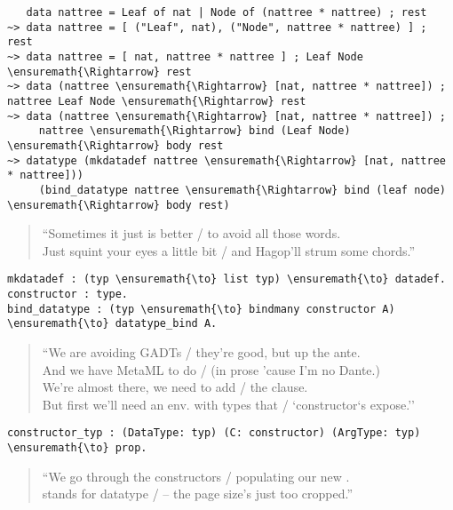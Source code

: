 \begin{verbatim}
   data nattree = Leaf of nat | Node of (nattree * nattree) ; rest
~> data nattree = [ ("Leaf", nat), ("Node", nattree * nattree) ] ; rest
~> data nattree = [ nat, nattree * nattree ] ; Leaf Node \ensuremath{\Rightarrow} rest
~> data (nattree \ensuremath{\Rightarrow} [nat, nattree * nattree]) ; nattree Leaf Node \ensuremath{\Rightarrow} rest
~> data (nattree \ensuremath{\Rightarrow} [nat, nattree * nattree]) ;
     nattree \ensuremath{\Rightarrow} bind (Leaf Node) \ensuremath{\Rightarrow} body rest
~> datatype (mkdatadef nattree \ensuremath{\Rightarrow} [nat, nattree * nattree]))
     (bind_datatype nattree \ensuremath{\Rightarrow} bind (leaf node) \ensuremath{\Rightarrow} body rest)
\end{verbatim}

\begin{verse}
``Sometimes it just is better / to avoid all those words. \\
Just squint your eyes a little bit / and Hagop'll strum some chords.''
\end{verse}

\begin{verbatim}
mkdatadef : (typ \ensuremath{\to} list typ) \ensuremath{\to} datadef.
constructor : type.
bind_datatype : (typ \ensuremath{\to} bindmany constructor A) \ensuremath{\to} datatype_bind A.
\end{verbatim}

\begin{verse}
``We are avoiding GADTs / they're good, but up the ante. \\
And we have MetaML to do / (in prose 'cause I'm no Dante.) \\
We're almost there, we need to add / the  clause. \\
But first we'll need an env. with types that / `constructor`s expose.''
\end{verse}

\begin{verbatim}
constructor_typ : (DataType: typ) (C: constructor) (ArgType: typ) \ensuremath{\to} prop.
\end{verbatim}

\begin{verse}
``We go through the constructors / populating our new . \\
 stands for datatype / -- the page size's just too cropped.''
\end{verse}

